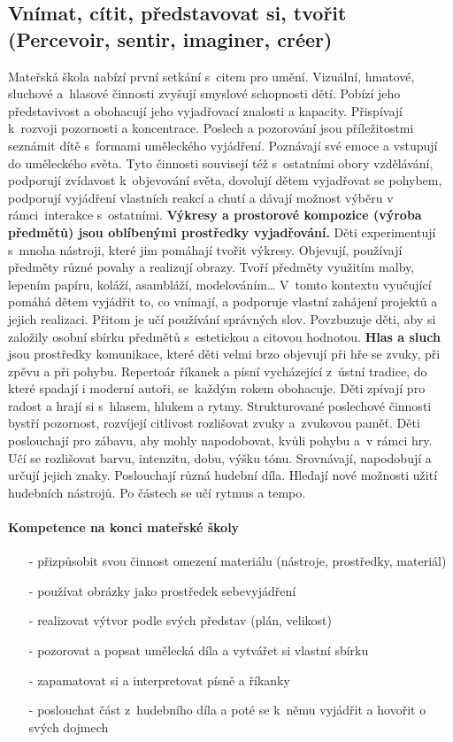 		\subsection{Vnímat, cítit, představovat si, tvořit (Percevoir, sentir, imaginer, créer)}
			Mateřská škola nabízí první setkání s citem pro umění. Vizuální, hmatové, sluchové a hlasové činnosti zvyšují smyslové schopnosti dětí. Pobízí jeho představivost a obohacují jeho vyjadřovací znalosti a kapacity. Přispívají k rozvoji pozornosti a koncentrace. Poslech a pozorování jsou příležitostmi seznámit dítě s formami uměleckého vyjádření. Poznávají své emoce a vstupují do uměleckého světa.
			Tyto činnosti souvisejí též s ostatními obory vzdělávání, podporují zvídavost k objevování světa, dovolují dětem vyjadřovat se pohybem, podporují vyjádření vlastních reakcí a chutí a dávají možnost výběru v rámci interakce s ostatními.
			\textbf{Výkresy a prostorové kompozice (výroba předmětů) jsou oblíbenými prostředky vyjadřování.}
			Děti experimentují s mnoha nástroji, které jim pomáhají tvořit výkresy. Objevují, používají předměty různé povahy a realizují obrazy. Tvoří předměty využitím malby, lepením papíru, koláží, asambláží, modelováním…
			V tomto kontextu vyučující pomáhá dětem vyjádřit to, co vnímají, a podporuje vlastní zahájení projektů a jejich realizaci. Přitom je učí používání správných slov. Povzbuzuje děti, aby si založily osobní sbírku předmětů s estetickou a citovou hodnotou.
			\textbf{Hlas a sluch} jsou prostředky komunikace, které děti velmi brzo objevují při hře se zvuky, při zpěvu a při pohybu.
			Repertoár říkanek a písní vycházející z ústní tradice, do které spadají i moderní autoři, se každým rokem obohacuje. Děti zpívají pro radost a hrají si s hlasem, hlukem a rytmy.
			Strukturované poslechové činnosti bystří pozornost, rozvíjejí citlivost rozlišovat zvuky a zvukovou paměť. Děti poslouchají pro zábavu, aby mohly napodobovat, kvůli pohybu a v rámci hry. Učí se rozlišovat barvu, intenzitu, dobu, výšku tónu. Srovnávají, napodobují a určují jejich znaky. Poslouchají různá hudební díla. Hledají nové možnosti užití hudebních nástrojů. Po částech se učí rytmus a tempo. 

			\paragraph{Kompetence na konci mateřské školy}
				\begin{itemize}
					\setlength\itemsep{-2mm}
					\item[-] přizpůsobit svou činnost omezení materiálu (nástroje, prostředky, materiál)
					\item[-] používat obrázky jako prostředek sebevyjádření
					\item[-] realizovat výtvor podle svých představ (plán, velikost)
					\item[-] pozorovat a popsat umělecká díla a vytvářet si vlastní sbírku
					\item[-] zapamatovat si a interpretovat písně a říkanky
					\item[-] poslouchat část z hudebního díla a poté se k němu vyjádřit a hovořit o svých dojmech
				\end{itemize}


